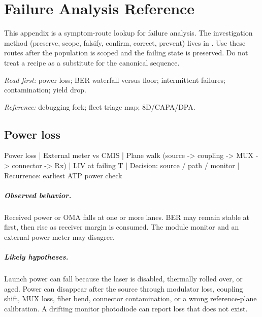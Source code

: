 \chapter{Failure Analysis Reference}
\label{app:failure-analysis-reference}

This appendix is a symptom-route lookup for failure analysis. The investigation
method (preserve, scope, falsify, confirm, correct, prevent) lives in
. Use these routes after the population is scoped and
the failing state is preserved. Do not treat a recipe as a substitute for the
canonical sequence.

\textit{Read first:} power loss; BER waterfall versus floor; intermittent
failures; contamination; yield drop.

\textit{Reference:} debugging fork; fleet triage map; 8D/CAPA/DPA.

\section{Power loss}
\label{sec:fm-power-loss}

\begin{dectree}
Power loss
  |
External meter vs CMIS
  |
Plane walk (source -> coupling -> MUX -> connector -> Rx)
  |
LIV at failing T
  |
Decision: source / path / monitor
  |
Recurrence: earliest ATP power check
\end{dectree}

\paragraph{Observed behavior.}
Received power or OMA falls at one or more lanes. BER may remain stable at first,
then rise as receiver margin is consumed. The module monitor and an external
power meter may disagree.

\paragraph{Likely hypotheses.}
Launch power can fall because the laser is disabled, thermally rolled over, or
aged. Power can disappear after the source through modulator loss, coupling
shift, MUX loss, fiber bend, connector contamination, or a wrong reference-plane
calibration. A drifting monitor photodiode can report loss that does not exist.

